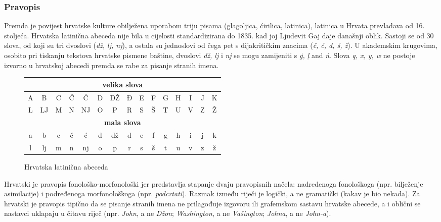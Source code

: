 \begin{multicols}{2}
\subsubsection{Pravopis}

Premda je povijest hrvatske kulture obilježena uporabom triju pisama (glagoljica, ćirilica, latinica), latinica u Hrvata prevladava od 16. stoljeća. Hrvatska latinična abeceda nije bila u cijelosti standardizirana do 1835. kad joj Ljudevit Gaj daje današnji oblik. Sastoji se od 30 slova, od koji su tri dvoslovi (\emph{dž, lj, nj}), a ostala su jednoslovi od čega pet s dijakritičkim znacima (\emph{č, ć, đ, š, ž}). U akademskim krugovima, osobito pri tiskanju tekstova hrvatske pismene baštine, dvoslovi \emph{dž, lj} i \emph{nj} se mogu zamijeniti s \emph{ģ, ļ} and \emph{ń}. Slova \emph{q, x, y, w} ne postoje izvorno u hrvatskoj abecedi premda se rabe za pisanje stranih imena.

\begin{figure*}[htb]
\centering
	\begin{tabular} {|c|c|c|c|c|c|c|c|c|c|c|c|c|c|c|}
        \hline
        \multicolumn{15}{|c|}{\textbf{velika slova}} \\ \hline
        A & B  & C & Č & Ć  & D & DŽ & Đ & E & F & G & H & I & J & K \\ \hline
        L & LJ & M & N & NJ & O & P  & R & S & Š & T & U & V & Z & Ž \\ \hline
        \multicolumn{15}{|c|}{\textbf{mala slova}} \\ \hline
        a & b  & c & č & ć  & d & dž & đ & e & f & g & h & i & j & k \\ \hline
        l & lj & m & n & nj & o & p  & r & s & š & t & u & v & z & ž \\
        \hline
   \end{tabular}
  \caption{Hrvatska latinična abeceda}
  \label{fig:abeceda}
\end{figure*}

Hrvatski je pravopis fonološko-morfonološki jer predstavlja stapanje dvaju pravopisnih načela: nadređenoga fonološkoga (npr. bilježenje asimilacije) i podređenoga morfonološkoga (npr. \emph{podcrtati}). Razmak između riječi je logički, a ne gramatički (kakav je bio nekada). Za hrvatski je pravopis tipično da se pisanje stranih imena ne prilagođuje izgovoru ili grafemskom sastavu hrvatske abecede, a i oblični se nastavci uklapaju u čitavu riječ (npr. \emph{John}, a ne \emph{Džon}; \emph{Washington}, a ne \emph{Vašington}; \emph{Johna}, a ne \emph{John-a}).


\end{multicols}

